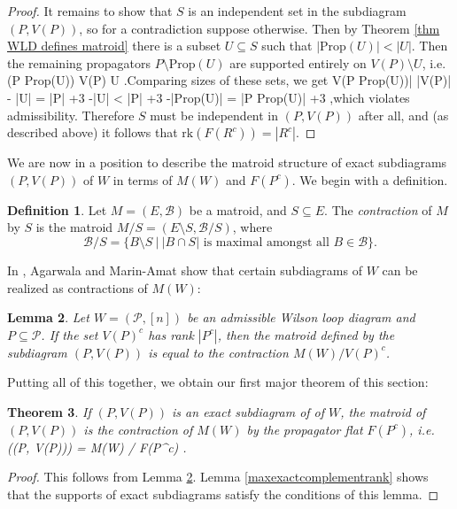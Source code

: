 \documentclass[11pt]{article}
\newcommand{\rk}{\textrm{rk} }
\def\bas #1\eas{\begin{align*} #1 \end{align*}}
\newcommand{\cP}{\mathcal{P}}
\newcommand{\cB}{\mathcal{B}}
\newcommand{\Prop}{\textrm{Prop}}
\newtheorem{thm}{Theorem}[section]
\newtheorem{lem}[thm]{Lemma}
\theoremstyle{remark}
\theoremstyle{definition}
\newtheorem{dfn}[thm]{Definition}
\begin{document}
\begin{proof}
It remains to show that $S$ is an independent set in the subdiagram $(P, V(P))$, so for a contradiction suppose otherwise. Then by Theorem \ref{thm WLD defines matroid} there is a subset $U \subseteq S$ such that $|\Prop(U)| < |U|$. Then the remaining propagators $P \setminus \Prop(U)$ are supported entirely on $V(P) \setminus U$, i.e. \bas  V(P \setminus \Prop(U)) \subseteq V(P) \setminus U\; .\eas Comparing sizes of these sets, we get \bas |V(P \setminus \Prop(U))| \leq |V(P)| - |U| = |P| +3 -|U| < |P| +3 -|\Prop(U)| = |P \setminus \Prop(U)| +3\; ,\eas which violates admissibility. Therefore $S$ must be independent in $(P, V(P))$ after all, and (as described above) it follows that $\rk(F(R^c)) = |R^c|$.

\end{proof}

We are now in a position to describe the matroid structure of exact subdiagrams $(P, V(P))$ of $W$ in terms of $M(W)$ and $F(P^c)$. We begin with a definition.

\begin{dfn}\label{matroid contraction}
Let $M = (E,\cB)$ be a matroid, and $S \subseteq E$. The {\em contraction} of $M$ by $S$ is the matroid $M/S = (E \setminus S, \cB / S)$, where
\[\cB / S = \{B \setminus S \ \big| \ |B\cap S | \text{ is maximal amongst all }B \in \cB\}.\]
\end{dfn}

In \cite{wilsonloop}, Agarwala and Marin-Amat show that certain subdiagrams of $W$ can be realized as contractions of $M(W)$:

\begin{lem} \label{contractsubdiaglem} \cite[Theorem 3.33]{wilsonloop} 
Let $W = (\cP, [n])$ be an admissible Wilson loop diagram and $P \subseteq \cP$. If the set $V(P)^c$ has rank $|P^c|$, then the matroid defined by the subdiagram $(P, V(P))$ is equal to the contraction $M(W)/V(P)^c$.
\end{lem}

Putting all of this together, we obtain our first major theorem of this section:

\begin{thm} \label{exact diagrams contractions}
If $(P, V(P))$ is an exact subdiagram of of $W$, the matroid of $(P,V(P))$ is the contraction of $M(W)$ by the propagator flat $F(P^c)$, i.e. \bas M\big((P, V(P))\big) = M(W)  / F(P^c) \;.\eas 
\end{thm}

\begin{proof}
This follows from Lemma \ref{contractsubdiaglem}. Lemma \ref{maxexactcomplementrank} shows that the supports of exact subdiagrams satisfy the conditions of this lemma.
\end{proof}
\end{document}
